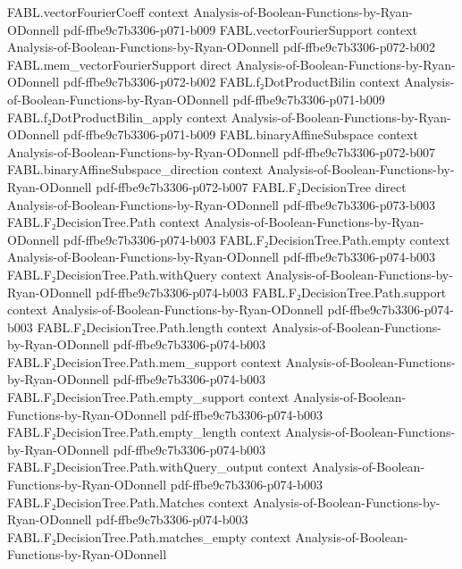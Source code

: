 \begin{theorem}
  {FABL.vectorFourierCoeff}
  {context}
  {Analysis-of-Boolean-Functions-by-Ryan-ODonnell}
  {pdf-ffbe9c7b3306-p071-b009}
\proofstep
  {FABL.vectorFourierSupport}
  {context}
  {Analysis-of-Boolean-Functions-by-Ryan-ODonnell}
  {pdf-ffbe9c7b3306-p072-b002}
\proofstep
  {FABL.mem_vectorFourierSupport}
  {direct}
  {Analysis-of-Boolean-Functions-by-Ryan-ODonnell}
  {pdf-ffbe9c7b3306-p072-b002}
\proofstep
  {FABL.f₂DotProductBilin}
  {context}
  {Analysis-of-Boolean-Functions-by-Ryan-ODonnell}
  {pdf-ffbe9c7b3306-p071-b009}
\proofstep
  {FABL.f₂DotProductBilin_apply}
  {context}
  {Analysis-of-Boolean-Functions-by-Ryan-ODonnell}
  {pdf-ffbe9c7b3306-p071-b009}
\proofstep
  {FABL.binaryAffineSubspace}
  {context}
  {Analysis-of-Boolean-Functions-by-Ryan-ODonnell}
  {pdf-ffbe9c7b3306-p072-b007}
\proofstep
  {FABL.binaryAffineSubspace_direction}
  {context}
  {Analysis-of-Boolean-Functions-by-Ryan-ODonnell}
  {pdf-ffbe9c7b3306-p072-b007}
\proofstep
  {FABL.F₂DecisionTree}
  {direct}
  {Analysis-of-Boolean-Functions-by-Ryan-ODonnell}
  {pdf-ffbe9c7b3306-p073-b003}
\proofstep
  {FABL.F₂DecisionTree.Path}
  {context}
  {Analysis-of-Boolean-Functions-by-Ryan-ODonnell}
  {pdf-ffbe9c7b3306-p074-b003}
\proofstep
  {FABL.F₂DecisionTree.Path.empty}
  {context}
  {Analysis-of-Boolean-Functions-by-Ryan-ODonnell}
  {pdf-ffbe9c7b3306-p074-b003}
\proofstep
  {FABL.F₂DecisionTree.Path.withQuery}
  {context}
  {Analysis-of-Boolean-Functions-by-Ryan-ODonnell}
  {pdf-ffbe9c7b3306-p074-b003}
\proofstep
  {FABL.F₂DecisionTree.Path.support}
  {context}
  {Analysis-of-Boolean-Functions-by-Ryan-ODonnell}
  {pdf-ffbe9c7b3306-p074-b003}
\proofstep
  {FABL.F₂DecisionTree.Path.length}
  {context}
  {Analysis-of-Boolean-Functions-by-Ryan-ODonnell}
  {pdf-ffbe9c7b3306-p074-b003}
\proofstep
  {FABL.F₂DecisionTree.Path.mem_support}
  {context}
  {Analysis-of-Boolean-Functions-by-Ryan-ODonnell}
  {pdf-ffbe9c7b3306-p074-b003}
\proofstep
  {FABL.F₂DecisionTree.Path.empty_support}
  {context}
  {Analysis-of-Boolean-Functions-by-Ryan-ODonnell}
  {pdf-ffbe9c7b3306-p074-b003}
\proofstep
  {FABL.F₂DecisionTree.Path.empty_length}
  {context}
  {Analysis-of-Boolean-Functions-by-Ryan-ODonnell}
  {pdf-ffbe9c7b3306-p074-b003}
\proofstep
  {FABL.F₂DecisionTree.Path.withQuery_output}
  {context}
  {Analysis-of-Boolean-Functions-by-Ryan-ODonnell}
  {pdf-ffbe9c7b3306-p074-b003}
\proofstep
  {FABL.F₂DecisionTree.Path.Matches}
  {context}
  {Analysis-of-Boolean-Functions-by-Ryan-ODonnell}
  {pdf-ffbe9c7b3306-p074-b003}
\proofstep
  {FABL.F₂DecisionTree.Path.matches_empty}
  {context}
  {Analysis-of-Boolean-Functions-by-Ryan-ODonnell}

\end{theorem}
